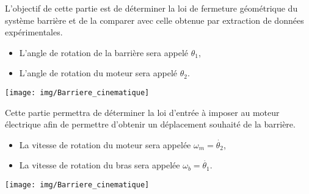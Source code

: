 



L'objectif de cette partie est de déterminer la loi de fermeture géométrique du système barrière et de la comparer avec celle obtenue par extraction de données expérimentales.

\begin{itemize}
 \item L'angle de rotation de la barrière sera appelé $\theta_1$,
 \item L'angle de rotation du moteur sera appelé $\theta_2$.
\end{itemize}

\begin{center}
 \texttt{[image: img/Barriere\_cinematique]}
\end{center}




\newpage


Cette partie permettra de déterminer la loi d'entrée à imposer au moteur électrique afin de permettre d'obtenir un déplacement souhaité de la barrière.

\begin{itemize}
 \item La vitesse de rotation du moteur sera appelée $\omega_m=\dot{\theta_2}$,
 \item La vitesse de rotation du bras sera appelée $\omega_b=\dot{\theta_1}$.
\end{itemize}

\begin{center}
 \texttt{[image: img/Barriere\_cinematique]}
\end{center}

